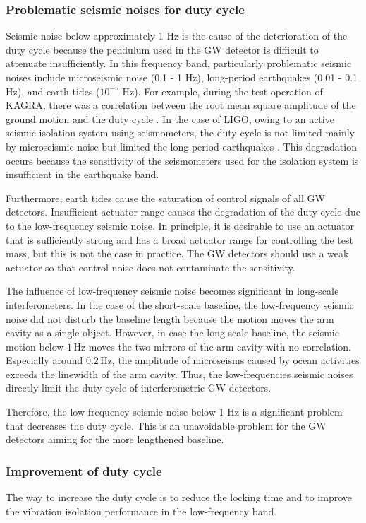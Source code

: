 \subsubsection{Problematic seismic noises for duty cycle}
Seismic noise below approximately 1 Hz is the cause of the deterioration of the duty cycle because the pendulum used in the GW detector is difficult to attenuate insufficiently. In this frequency band, particularly problematic seismic noises include microseismic noise (0.1 - 1 Hz), long-period earthquakes (0.01 - 0.1 Hz), and earth tides ($10^{-5}$ Hz). For example, during the test operation of KAGRA, there was a correlation between the root mean square amplitude of the ground motion and the duty cycle \cite{akutsu2019first}. In the case of LIGO, owing to an active seismic isolation system using seismometers, the duty cycle is not limited mainly by microseismic noise but limited the long-period earthquakes \cite{Biscans2018control}. This degradation occurs because the sensitivity of the seismometers used for the isolation system is insufficient in the earthquake band.

Furthermore, earth tides cause the saturation of control signals of all GW detectors. Insufficient actuator range causes the degradation of the duty cycle due to the low-frequency seismic noise. In principle, it is desirable to use an actuator that is sufficiently strong and has a broad actuator range for controlling the test mass, but this is not the case in practice. The GW detectors should use a weak actuator so that control noise does not contaminate the sensitivity. 

The influence of low-frequency seismic noise becomes significant in long-scale interferometers. In the case of the short-scale baseline, the low-frequency seismic noise did not disturb the baseline length because the motion moves the arm cavity as a single object. However, in case the long-scale baseline, the seismic motion below $1\,\mathrm{Hz}$ moves the two mirrors of the arm cavity with no correlation. Especially around $0.2\,\mathrm{Hz}$, the amplitude of microseisms caused by ocean activities exceeds the linewidth of the arm cavity. Thus, the low-frequencies seismic noises directly limit the duty cycle of interferometric GW detectors.

Therefore, the low-frequency seismic noise below 1 Hz is a significant problem that decreases the duty cycle. This is an unavoidable problem for the GW detectors aiming for the more lengthened baseline.

\subsubsection{Improvement of duty cycle}
The way to increase the duty cycle is to reduce the locking time and to improve the vibration isolation performance in the low-frequency band.

